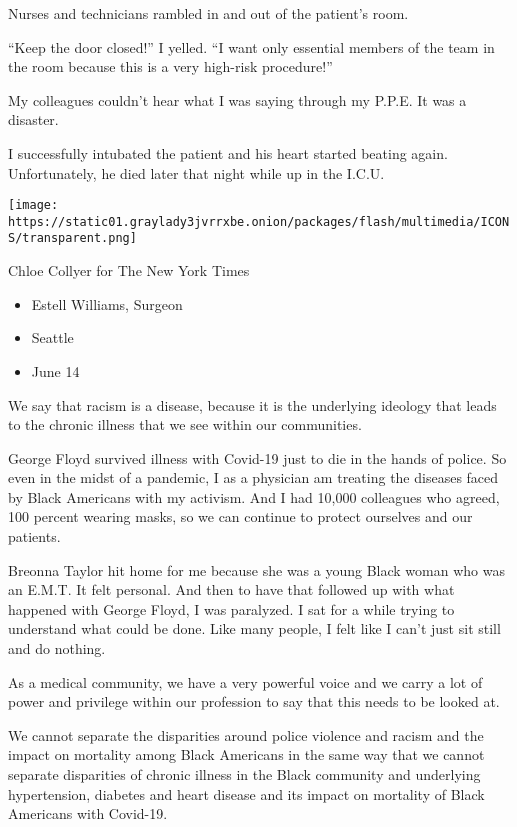 Nurses and technicians rambled in and out of the patient's room.

``Keep the door closed!'' I yelled. ``I want only essential members of
the team in the room because this is a very high-risk procedure!''

My colleagues couldn't hear what I was saying through my P.P.E. It was a
disaster.

I successfully intubated the patient and his heart started beating
again. Unfortunately, he died later that night while up in the I.C.U.

\texttt{[image: https://static01.graylady3jvrrxbe.onion/packages/flash/multimedia/ICONS/transparent.png]}

Chloe Collyer for The New York Times

\begin{itemize}
\tightlist
\item
  Estell Williams, Surgeon
\item
  Seattle
\item
  June 14
\end{itemize}

We say that racism is a disease, because it is the underlying ideology
that leads to the chronic illness that we see within our communities.

George Floyd survived illness with Covid-19 just to die in the hands of
police. So even in the midst of a pandemic, I as a physician am treating
the diseases faced by Black Americans with my activism. And I had 10,000
colleagues who agreed, 100 percent wearing masks, so we can continue to
protect ourselves and our patients.

Breonna Taylor hit home for me because she was a young Black woman who
was an E.M.T. It felt personal. And then to have that followed up with
what happened with George Floyd, I was paralyzed. I sat for a while
trying to understand what could be done. Like many people, I felt like I
can't just sit still and do nothing.

As a medical community, we have a very powerful voice and we carry a lot
of power and privilege within our profession to say that this needs to
be looked at.

We cannot separate the disparities around police violence and racism and
the impact on mortality among Black Americans in the same way that we
cannot separate disparities of chronic illness in the Black community
and underlying hypertension, diabetes and heart disease and its impact
on mortality of Black Americans with Covid-19.

